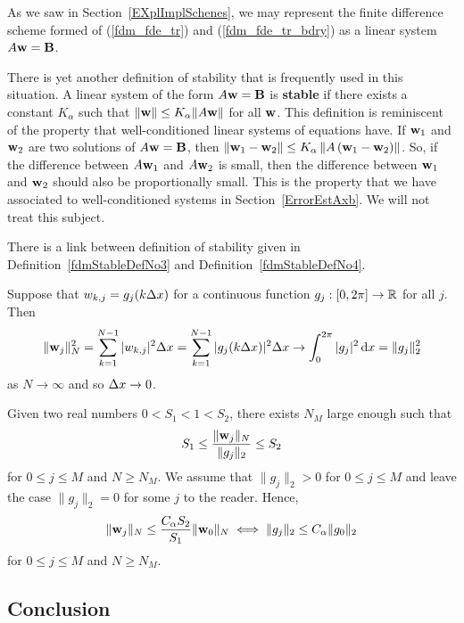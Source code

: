 \begin{rmk}
As we saw in Section~\ref{EXplImplSchenes}, we may represent the
finite difference scheme formed of (\ref{fdm_fde_tr}) and
(\ref{fdm_fde_tr_bdry}) as a linear system $A\mathbf{w} = \mathbf{B}$.

There is yet another definition of stability that is frequently used in
this situation.  A linear system of the form $A \mathbf{w} = \mathbf{B}$ is
{\bfseries stable} if there
exists a constant $K_\alpha$ such that
$\| \mathbf{w} \| \leq K_\alpha \| A \mathbf{w}\|$
for all $\mathbf{w}$.  This definition is reminiscent of the property
that well-conditioned linear systems of equations have.  If $\mathbf{w}_1$
and $\mathbf{w}_2$ are two solutions of $A \mathbf{w} = \mathbf{B}$, then
$\displaystyle \left\| \mathbf{w}_1- \mathbf{w}_2 \right\| \leq
K_\alpha \left\| A \left(\mathbf{w}_1 - \mathbf{w}_2\right)\right\|$.  So, if the
difference between $A \mathbf{w}_1$ and $A \mathbf{w}_2$ is small, then the
difference between $\mathbf{w}_1$ and $\mathbf{w}_2$ should also be
proportionally small.  This is the property that we have associated to
well-conditioned systems in Section~\ref{ErrorEstAxb}.  We will not
treat this subject.
\end{rmk}

\begin{rmk}
There is a link between definition of stability given in
Definition~\ref{fdmStableDefNo3} and Definition~\ref{fdmStableDefNo4}.

Suppose that $w_{k,j} = g_j(k \Delta{x})$ for a continuous function
$g_j:[0,2\pi]\to \mathbb{R}$ for all $j$.  Then
\[
 \|\mathbf{w}_j\|_N^2 = \sum_{k=1}^{N-1} |w_{k,j}|^2 \Delta{x}
= \sum_{k=1}^{N-1} |g_j(k\Delta{x})|^2 \Delta{x}
\to \int_0^{2\pi} |g_j|^2 \,\mathrm{d}x = \|g_j\|_2^2
\]
as $N \to \infty$ and so $\Delta{x} \to 0$.

Given two real numbers $0 < S_1 < 1 < S_2$, there exists $N_M$ large
enough such that
\[
  S_1 \leq \frac{\|\mathbf{w}_j\|_N}{\|g_j\|_2} \leq S_2
\]
for $0\leq j \leq M$ and $N \geq N_M$.  We assume that
$\|g_j\|_2 >0$ for $0 \leq j \leq M$ and leave the case
$\|g_j\|_2 = 0$ for some $j$ to the reader.  Hence,
\[
\|\mathbf{w}_j\|_N \leq \frac{C_\alpha S_2}{S_1} \|\mathbf{w}_0\|_N
\iff \|g_j\|_2 \leq C_\alpha \|g_0\|_2
\]
for $0\leq j \leq M$ and $N \geq N_M$.
\end{rmk}

\subsection{Conclusion}

